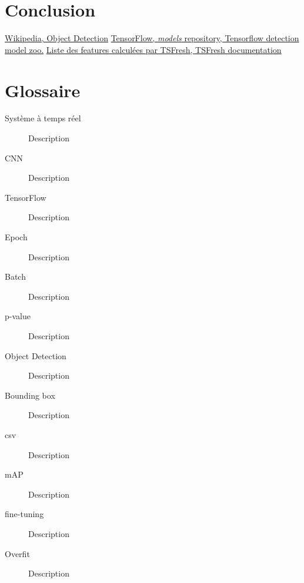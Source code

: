\documentclass[french]{article}
\theoremstyle{mytheoremstyle}
\theoremstyle{mytheoremstyle}
\theoremstyle{myproblemstyle}
\begin{document}
    \section{Conclusion}

\renewcommand\refname{7\indent Références}
\begin{thebibliography}{1}
 \href{https://en.wikipedia.org/wiki/Object\_detection}{Wikipedia, Object Detection}
 \href{https://github.com/tensorflow/models/blob/master/research/object_detection/g3doc/detection_model_zoo.md#coco-trained-models}{TensorFlow, \textit{models} repository, Tensorflow detection model zoo.}
 \href{https://tsfresh.readthedocs.io/en/latest/text/list_of_features.html}{Liste des features calculées par TSFresh, TSFresh documentation}
\end{thebibliography}
\clearpage

\section*{Glossaire}

\begin{description}  
\item [Système à temps réel] Description
\item [CNN] Description
\item [TensorFlow] Description
\item [Epoch] Description
\item [Batch] Description
\item [p-value] Description
\item [Object Detection] Description
\item [Bounding box] Description
\item [csv] Description
\item [mAP] Description
\item [fine-tuning] Description
\item [Overfit] Description
\end{description}
\end{document}
